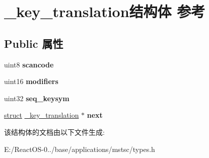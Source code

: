 \hypertarget{struct__key__translation}{}\section{\+\_\+key\+\_\+translation结构体 参考}
\label{struct__key__translation}
\subsection*{Public 属性}
\begin{DoxyCompactItemize}
\item 
\mbox{\label{struct__key__translation_a351ecf62880f3bbc3dfadc54a4b49e54}} 
uint8 {\bfseries scancode}
\item 
\mbox{\label{struct__key__translation_a20c5c70a6d59f37ba0dc9513a17c58a8}} 
uint16 {\bfseries modifiers}
\item 
\mbox{\label{struct__key__translation_a9121f9b94daeff6be306f4dc5bba31f7}} 
uint32 {\bfseries seq\+\_\+keysym}
\item 
\mbox{\label{struct__key__translation_ab2c4ce677501a70563bc9cab0271fffe}} 
\hyperlink{interfacestruct}{struct} \hyperlink{struct__key__translation}{\+\_\+key\+\_\+translation} $\ast$ {\bfseries next}
\end{DoxyCompactItemize}


该结构体的文档由以下文件生成\+:\begin{DoxyCompactItemize}
\item 
E\+:/\+React\+O\+S-\/0../base/applications/mstsc/types.\+h\end{DoxyCompactItemize}
